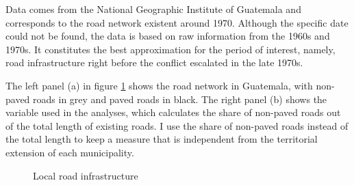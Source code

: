 \documentclass[12pt, notitlepage]{article}
\begin{document}
Data comes from the National Geographic Institute of Guatemala \citep{Segeplan:2019aa} and corresponds to the road network existent around 1970.
Although the specific date could not be found, the data is based on raw information from the 1960s and 1970s.
It constitutes the best approximation for the period of interest, namely, road infrastructure right before the conflict escalated in the late 1970s.

The left panel (a) in figure \ref{fig:map_roads} shows the road network in Guatemala, with non-paved roads in grey and paved roads in black.
The right panel (b) shows the variable used in the analyses, which calculates the share of non-paved roads out of the total length of existing roads.
I use the share of non-paved roads instead of the total length to keep a measure that is independent from the territorial extension of each municipality.

\begin{figure}[!ht]
    \centering

    \begin{minipage}{1\textwidth}
      \centering
      \hspace{25pt}
    \end{minipage}

    \caption{Local road infrastructure} \label{fig:map_roads}

\end{figure}
\end{document}
